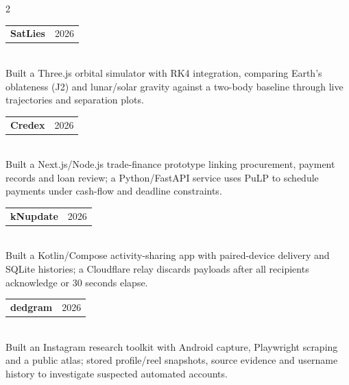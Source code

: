 \documentclass[letterpaper,10pt]{article}
\makeatletter
\newcommand{\proj}[3]{%
  \vspace{2pt}
  \begin{tabular*}{\linewidth}{@{}l@{\extracolsep{\fill}}r@{}}
    \small\textbf{#1}\hspace{4pt}{\scriptsize\textit{#2}} & \footnotesize #3
  \end{tabular*}\vspace{-4pt}
}
\makeatother
\begin{document}
\begin{paracol}{2}
\proj{SatLies}{}{2026}\\[4pt]
{\small Built a Three.js orbital simulator with RK4 integration, comparing Earth's oblateness (J2) and lunar/solar gravity against a two-body baseline through live trajectories and separation plots.}

\vspace{4pt}

\proj{Credex}{}{2026}\\[4pt]
{\small Built a Next.js/Node.js trade-finance prototype linking procurement, payment records and loan review; a Python/FastAPI service uses PuLP to schedule payments under cash-flow and deadline constraints.}

\vspace{4pt}

\proj{kNupdate}{}{2026}\\[4pt]
{\small Built a Kotlin/Compose activity-sharing app with paired-device delivery and SQLite histories; a Cloudflare relay discards payloads after all recipients acknowledge or 30 seconds elapse.}

\vspace{4pt}

\proj{dedgram}{}{2026}\\[4pt]
{\small Built an Instagram research toolkit with Android capture, Playwright scraping and a public atlas; stored profile/reel snapshots, source evidence and username history to investigate suspected automated accounts.}

\end{paracol}
\end{document}
